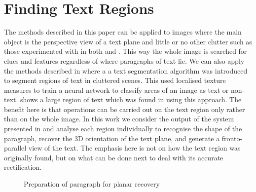 \section{Finding Text Regions}   \label{recoveryusinglines}

The methods described in this paper can be applied to images where the main
object is the perspective view of a text plane and little or no other clutter
such as those experimented with in both \cite{pilucvpr1} and \cite{dance02}.
This way the whole image is searched for clues and features regardless of where
paragraphs of text lie. We can also apply the methods described in
\cite{ClarkICPR2000,clark-ijdar-2001} where a  a text segmentation algorithm was 
introduced to segment regions of text in cluttered scenes. This used 
localised texture measures to train a neural network to classify areas of an
image as text or non-text.  shows a large region of text 
which was found in  using this approach. The benefit here is
that operations can be carried out on the text region only rather than on the
whole image.
In this work we consider the output of the system presented in
\cite{ClarkICPR2000,clark-ijdar-2001} and analyse each region individually to recognise the shape
of the paragraph, recover the 3D orientation of the text plane, and generate a
fronto-parallel view of the text. The emphasis here is not on how the text
region was originally found, but on what can be done next to deal with its
accurate rectification.

\begin{figure}[h]
\begin{centering}
  \hspace*{1mm}
  \hspace*{1mm}
\label{runprep}
\caption{Preparation of paragraph for planar recovery}
\end{centering}
\end{figure}


